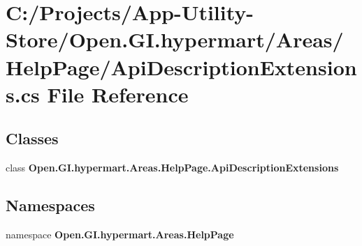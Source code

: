 \section{C\+:/\+Projects/\+App-\/\+Utility-\/\+Store/\+Open.G\+I.\+hypermart/\+Areas/\+Help\+Page/\+Api\+Description\+Extensions.cs File Reference}
\label{_api_description_extensions_8cs}
\subsection*{Classes}
\begin{DoxyCompactItemize}
\item 
class {\bfseries Open.\+G\+I.\+hypermart.\+Areas.\+Help\+Page.\+Api\+Description\+Extensions}
\end{DoxyCompactItemize}
\subsection*{Namespaces}
\begin{DoxyCompactItemize}
\item 
namespace \textbf{ Open.\+G\+I.\+hypermart.\+Areas.\+Help\+Page}
\end{DoxyCompactItemize}
